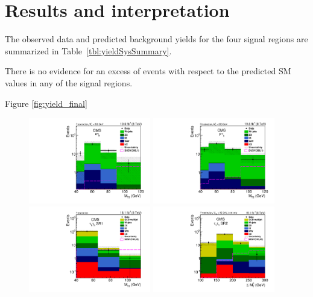 \section{Results and interpretation}
\label{sect:stat}
The observed data and predicted background yields for the four signal regions are summarized in Table~\ref{tbl:yieldSysSummary}. 

There is no evidence for an excess of events with respect to the predicted SM values in any of the signal regions.

Figure \ref{fig:yield_final}
\begin{figure}[!htb]
\centering
\includegraphics[width=0.475\textwidth,keepaspectratio=true]{StatisticsFig/MT2_tauMTgt200_DDFakeEleTau.pdf}
\includegraphics[width=0.475\textwidth,keepaspectratio=true]{StatisticsFig/MT2muTau_tauMTgt200_DDFake.pdf}
\includegraphics[width=0.475\textwidth,keepaspectratio=true]{StatisticsFig/QCDWestimation_bin1.pdf}
\includegraphics[width=0.475\textwidth,keepaspectratio=true]{StatisticsFig/QCDWestimation_bin2.pdf}

\end{figure}
